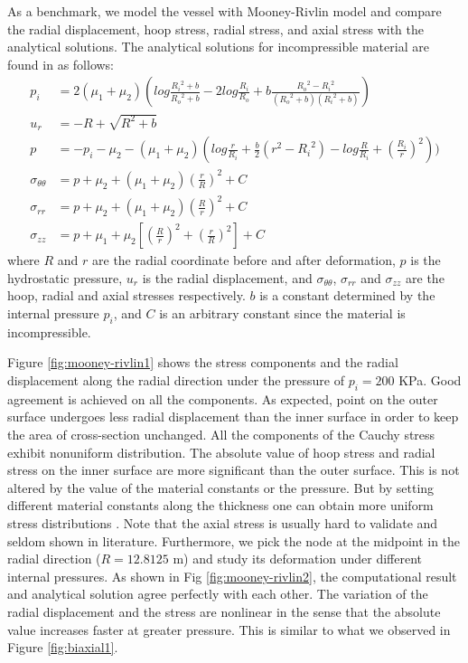 As a benchmark, we model the vessel with Mooney-Rivlin model and compare the radial displacement, hoop stress, radial stress, and axial stress with the analytical solutions. The analytical solutions for incompressible material are found in \cite{Green} as follows: 
\begin{subequations}
\begin{align}
p_i &= 2(\mu_1 + \mu_2)(log\frac{{R_i}^2 + b}{{R_o}^2 + b} - 2log\frac{R_i}{R_o} +
b\frac{{R_o}^2 - {R_i}^2}{({R_o}^2+b)({R_i}^2+b)}) \\
u_r &= -R + \sqrt{R^2 + b} \\
p &= - p_i - \mu_2 - (\mu_1 + \mu_2)(log\frac{r}{R_i} + \frac{b}{2}(r^2 - {R_i}^2) - log\frac{R}{R_i} + {(\frac{R_i}{r})}^2) ) \\
\sigma_{\theta\theta} &= p + \mu_2 + (\mu_1 + \mu_2)(\frac{r}{R})^2 + C \\
\sigma_{rr} &= p + \mu_2 + (\mu_1 + \mu_2)(\frac{R}{r})^2 + C \\
\sigma_{zz} &= p +  \mu_1 + \mu_2[(\frac{R}{r})^2 + (\frac{r}{R})^2] + C
\end{align}
\end{subequations}
where $R$ and $r$ are the radial coordinate before and after deformation, $p$ is the hydrostatic pressure, $u_r$ is the radial displacement, and $\sigma_{\theta\theta}$, $\sigma_{rr}$ and $\sigma_{zz}$ are the hoop, radial and axial stresses respectively. $b$ is a constant determined by the internal pressure $p_i$, and $C$ is an arbitrary constant since the material is incompressible. 

Figure \ref{fig:mooney-rivlin1} shows the stress components and the radial displacement along the radial direction under the pressure of $p_i = 200$ KPa. Good agreement is achieved on all the components. As expected, point on the outer surface undergoes less radial displacement than the inner surface in order to keep the area of cross-section unchanged. All the components of the Cauchy stress exhibit nonuniform distribution. The absolute value of hoop stress and radial stress on the inner surface are more significant than the outer surface. This is not altered by the value of the material constants or the pressure. But by setting different material constants along the thickness one can obtain more uniform stress distributions \cite{Batra}. Note that the axial stress is usually hard to validate and seldom shown in literature. Furthermore, we pick the node at the midpoint in the radial direction ($R = 12.8125$ m) and study its deformation under different internal pressures. As shown in Fig \ref{fig:mooney-rivlin2}, the computational result and analytical solution agree perfectly with each other. The variation of the radial displacement and the stress are nonlinear in the sense that the absolute value increases faster at greater pressure. This is similar to what we observed in Figure \ref{fig:biaxial1}.

